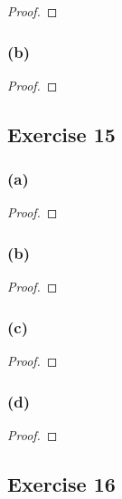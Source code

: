 \documentclass[14pt]{extarticle}
\begin{document}
\begin{proof}

\end{proof}

\subsubsection{(b)}

\begin{proof}

\end{proof}

\subsection{Exercise 15}

\subsubsection{(a)}

\begin{proof}

\end{proof}

\subsubsection{(b)}

\begin{proof}

\end{proof}

\subsubsection{(c)}

\begin{proof}

\end{proof}

\subsubsection{(d)}

\begin{proof}

\end{proof}

\subsection{Exercise 16}
\end{document}
